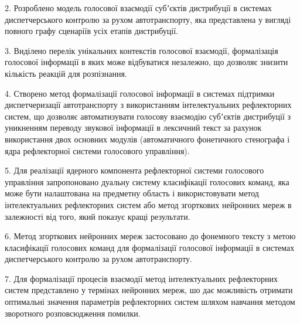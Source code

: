2. Розроблено модель голосової взаємодії субʼєктів дистрибуції в системах диспетчерського контролю за рухом автотранспорту, яка представлена у вигляді повного графу сценаріїв усіх етапів дистрибуції. 

3. Виділено перелік унікальних контекстів голосової взаємодії, формалізація голосової інформації в яких може відбуватися незалежно, що дозволяє знизити кількість реакцій для розпізнання.

4. Створено метод формалізації голосової інформації в системах підтримки диспетчеризації автотранспорту з використанням інтелектуальних рефлекторних систем, що дозволяє автоматизувати голосову взаємодію субʼєктів дистрибуції з уникненням переводу звукової інформації в лексичний текст за рахунок використання двох основних модулів (автоматичного фонетичного стенографа і ядра рефлекторної системи голосового управління).

5. Для реалізації ядерного компонента рефлекторної системи голосового управління запропоновано дуальну систему класифікації голосових команд, яка може бути налаштована на предметну область і використовувати метод інтелектуальних рефлекторних систем або метод згорткових нейронних мереж в залежності від того, який показує кращі результати.

6. Метод згорткових нейронних мереж застосовано до фонемного тексту з метою класифікації голосових команд для формалізації голосової інформації в системах диспетчерського контролю за рухом автотранспорту.

7. Для формалізації процесів взаємодії метод інтелектуальних рефлекторних систем представлено у термінах нейронних мереж, шо дає можливість отримати оптимальні значення параметрів рефлекторних систем шляхом навчання методом зворотного розповсюдження помилки.